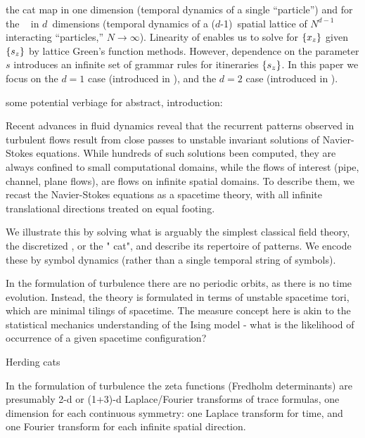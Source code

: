 \begin{description}
the cat map
in one dimension (temporal dynamics of a single
``particle'') and for the \catlatt\  in $d$~dimensions
(temporal dynamics of a ($d$-1)\dmn\ spatial lattice of $N^{d-1}$
interacting ``particles,'' $N\to\infty$).
Linearity of  enables us to solve for $\{x_{z}\}$ given
$\{{s_{z}}\}$ by lattice Green's function methods. However, dependence
on the parameter $s$ introduces an infinite set of grammar rules for
{\admissible} itineraries $\{{s_{z}}\}$.
In this paper we focus on the $d=1$ case (introduced in ), and
the $d=2$ case (introduced in ).


     {
some potential verbiage for abstract, introduction:

Recent advances in fluid dynamics reveal that the recurrent patterns
observed in turbulent flows result from close passes to unstable
invariant solutions of Navier-Stokes equations. While hundreds of such
solutions been computed, they are always confined to small computational
domains, while the flows of interest (pipe, channel, plane flows), are
flows on infinite spatial domains. To describe them, we recast the
Navier-Stokes equations as a spacetime theory, with all infinite
translational directions treated on equal footing.

We illustrate this by solving what is arguably the simplest classical
field theory, the discretized {\sPe}, or the
"{\spt} cat", and describe its repertoire of {\admissible}
{\spt} patterns. We encode these by {\spt} symbol
dynamics (rather than a single temporal string of symbols).

In the {\spt} formulation of turbulence there are no periodic
orbits, as there is no time evolution. Instead, the theory is formulated
in terms of unstable spacetime tori, which are minimal tilings of
spacetime. The measure concept here is akin to the statistical mechanics
understanding of the Ising model - what is the likelihood of occurrence
of a given spacetime configuration?

\bigskip

Herding cats

In the {\spt} formulation of turbulence the zeta functions
(Fredholm determinants) are presumably 2-d or (1+3)-d
Laplace/Fourier transforms of trace formulas, one dimension for
each continuous symmetry: one Laplace transform for time, and one
Fourier transform for each infinite spatial direction.

}
\end{description}
